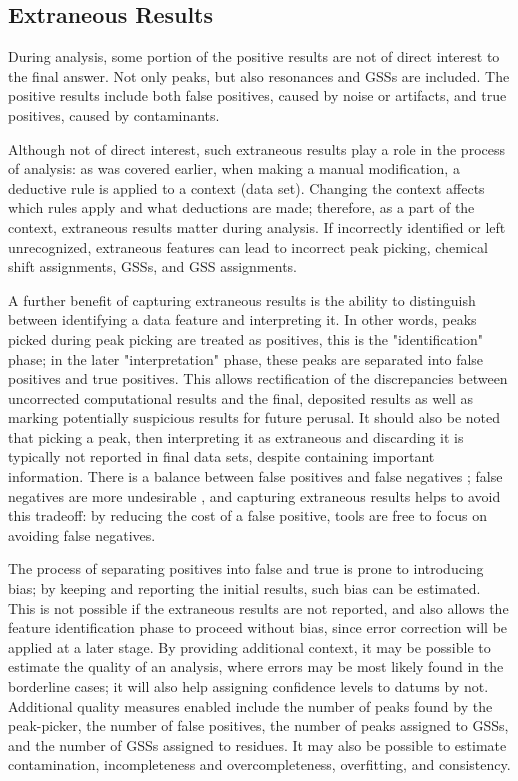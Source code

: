 \subsection{Extraneous Results}
During analysis, some portion of the positive results are not of direct interest
to the final answer.  Not only peaks, but also resonances and GSSs are included.
The positive results include both false positives, caused by noise or
artifacts, and true positives, caused by contaminants.

Although not of direct interest, such extraneous results play a role in 
the process of analysis: as was covered earlier, when making a manual
modification, a deductive rule is applied to a context (data set).  Changing 
the context affects which rules apply and what deductions are made; 
therefore, as a part of the context, extraneous results matter during analysis. 
If incorrectly identified or left unrecognized, extraneous features can
lead to incorrect peak picking, chemical shift assignments, GSSs, and GSS
assignments.

A further benefit of capturing extraneous results is the ability to distinguish
between identifying a data feature and interpreting it.  In other words, peaks
picked during peak picking are treated as positives, this is the "identification"
phase; in the later "interpretation" phase, these peaks are separated into
false positives and true positives.  This allows rectification of the 
discrepancies between uncorrected computational results and the final,
deposited results as well as marking potentially suspicious results for 
future perusal.  It should also be noted that picking a peak, then
interpreting it as extraneous and discarding it is typically not reported in
final data sets, despite containing important information.
There is a balance between false positives and false negatives \cite{pine};
false negatives are more undesirable \cite{pine, saga, guntert2009automated},
and capturing extraneous results helps to avoid this tradeoff: by reducing
the cost of a false positive, tools are free to focus on avoiding false
negatives.

The process of separating positives into false and true is prone to 
introducing bias; by keeping and reporting the initial results, such bias
can be estimated.  This is not possible if the extraneous results are not
reported, and also allows the feature identification phase to proceed
without bias, since error correction will be applied at a later stage. 
By providing additional context, it may be possible to estimate the quality 
of an analysis, where errors may be most likely found in the borderline 
cases; it will also help assigning confidence levels to datums by not.
Additional quality measures enabled include the number of peaks found by the
peak-picker, the number of false positives, the number of peaks assigned to
GSSs, and the number of GSSs assigned to residues.  It may also be possible
to estimate contamination, incompleteness and overcompleteness, overfitting, 
and consistency.

